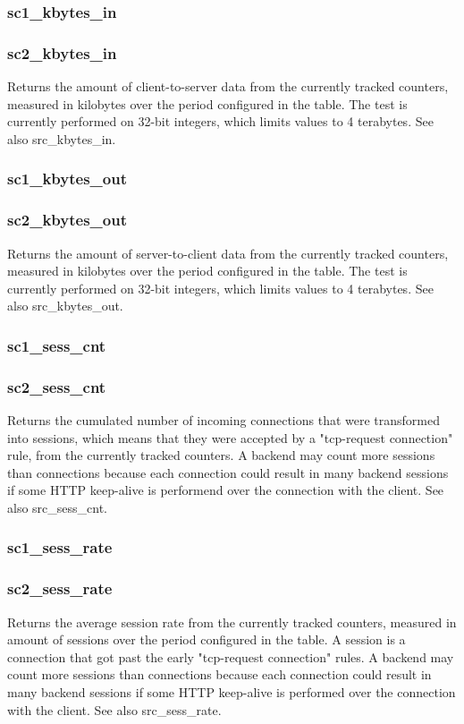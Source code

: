 \subsubsection{sc1\_kbytes\_in}
\subsubsection{sc2\_kbytes\_in}
  Returns the amount of client-to-server data from the currently tracked
  counters, measured in kilobytes over the period configured in the table. The
  test is currently performed on 32-bit integers, which limits values to 4
  terabytes. See also src\_kbytes\_in.

\subsubsection{sc1\_kbytes\_out}
\subsubsection{sc2\_kbytes\_out}
  Returns the amount of server-to-client data from the currently tracked
  counters, measured in kilobytes over the period configured in the table. The
  test is currently performed on 32-bit integers, which limits values to 4
  terabytes. See also src\_kbytes\_out.

\subsubsection{sc1\_sess\_cnt}
\subsubsection{sc2\_sess\_cnt}
  Returns the cumulated number of incoming connections that were transformed
  into sessions, which means that they were accepted by a "tcp-request
  connection" rule, from the currently tracked counters. A backend may count
  more sessions than connections because each connection could result in many
  backend sessions if some HTTP keep-alive is performend over the connection
  with the client. See also src\_sess\_cnt.

\subsubsection{sc1\_sess\_rate}
\subsubsection{sc2\_sess\_rate}
  Returns the average session rate from the currently tracked counters,
  measured in amount of sessions over the period configured in the table. A
  session is a connection that got past the early "tcp-request connection"
  rules. A backend may count more sessions than connections because each
  connection could result in many backend sessions if some HTTP keep-alive is
  performed over the connection with the client. See also src\_sess\_rate.

